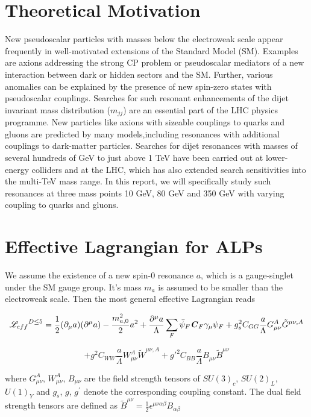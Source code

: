 \documentclass[12pt,a4paper]{article}
\begin{document}
\section{Theoretical Motivation}
New pseudoscalar particles with masses below the electroweak scale appear frequently in well-motivated extensions of the Standard Model (SM). Examples are axions addressing the strong CP problem or pseudoscalar mediators of a new interaction between dark or hidden sectors and the SM. Further, various anomalies can be explained by the presence of new spin-zero states with pseudoscalar couplings. Searches for such resonant enhancements of the dijet invariant mass distribution ($m_{jj}$) are an essential part of the LHC physics programme. New particles like axions with sizeable couplings to quarks and gluons are predicted by many models,including resonances with additional couplings to dark-matter particles.
Searches for dijet resonances with masses of several hundreds of GeV to just above 1 TeV have been carried out at lower-energy colliders and at the LHC, which has also extended search sensitivities into the multi-TeV mass range. In this report, we will specifically study such resonances at three mass points 10 GeV, 80 GeV and 350 GeV with varying coupling to quarks and gluons.


\section{Effective Lagrangian for ALPs}
We assume the existence of a new spin-0 resonance $a$, which is a gauge-singlet under the SM gauge group.  It's mass $m_a$ is assumed to be smaller than the electroweak scale. Then the most  general  effective  Lagrangian  reads 

\begin{equation}
{\mathscr{L}_{eff}}^{D\leq5} = \frac{1}{2} (\partial_\mu a)(\partial^\mu a)- \frac{m^2_{a,0}}{2} a^2 + \frac{\partial ^\mu a}{\Lambda} \sum_F \bar{\psi}_F \textbf{\textit{C}}_F  \gamma_\mu  \psi_F + g^2_s C_{GG} \frac{a}{\Lambda} G_{\mu \nu}^A \tilde{G}^{\mu \nu,A} 
\end{equation}

$$+ g^2 C_{WW} \frac{a}{\Lambda} W_{\mu \nu}^A \tilde{W}^{\mu \nu,A} + {g\prime ^2} C_{BB} \frac{a}{\Lambda}B_{\mu \nu} \tilde{B}^{\mu \nu} 
$$

where $G_{\mu \nu}^A$, $W_{\mu \nu}^A$, $B_{\mu \nu}$ are the field strength tensors of $SU(3)_c$, $SU(2)_L$, $U(1)_Y$ and $g_s$, $g$, $g^{\prime}$ denote the corresponding coupling constant. The dual field strength tensors are defined as $\tilde{B}^{\mu \nu} = \frac{1}{2} \epsilon^{\mu \nu \alpha \beta} B_{\alpha \beta}$
\end{document}

